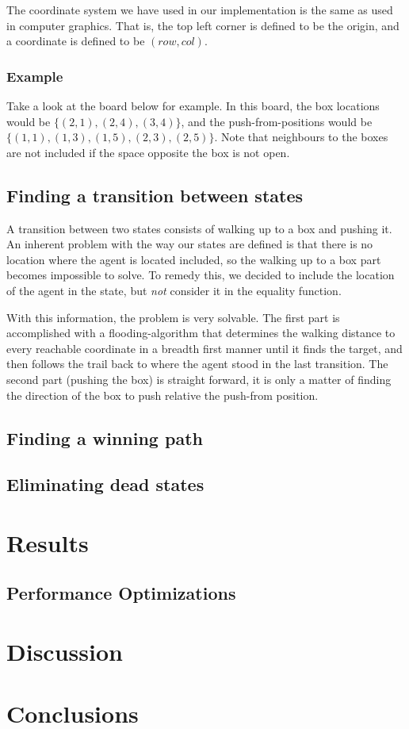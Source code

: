 \documentclass[a4paper,11pt]{article}
\begin{document}
The coordinate system we have used in our implementation is the same as used in computer graphics.
That is, the top left corner is defined to be the origin, and a coordinate is defined to be
$(row, col)$. 

\subsubsection{Example}
Take a look at the board below for example.
In this board, the box locations would be
$\{(2, 1), (2, 4), (3, 4)\}$,
and the push-from-positions would be
$\{(1,1), (1, 3), (1, 5), (2, 3), (2, 5)\}$.
Note that neighbours to the boxes are not included if the space opposite
the box is not open.


\subsection{Finding a transition between states}

A transition between two states consists of walking up to a box and pushing it.
An inherent problem with the way our states are defined is that there is no location
where the agent is located included, so the walking up to a box part becomes impossible to solve.
To remedy this, we decided to include the location of the agent in the state,
but \emph{not} consider it in the equality function.

With this information, the problem is very solvable.
The first part is accomplished with a flooding-algorithm that
determines the walking distance to every reachable coordinate in a breadth
first manner until it finds the target, and then follows the trail back to
where the agent stood in the last transition.
The second part (pushing the box) is straight forward, it is only a matter 
of finding the direction of the box to push relative the push-from position.


\subsection{Finding a winning path}

\subsection{Eliminating dead states}

\section{Results}

\subsection{Performance Optimizations}

\section{Discussion}

\section{Conclusions}
\end{document}
